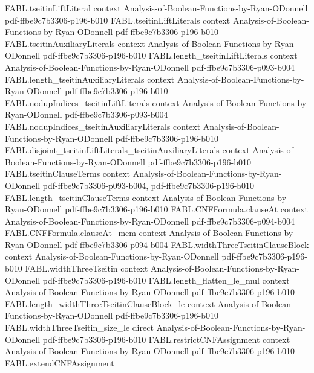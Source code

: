 \begin{theorem}
\proofstep
  {FABL.tseitinLiftLiteral}
  {context}
  {Analysis-of-Boolean-Functions-by-Ryan-ODonnell}
  {pdf-ffbe9c7b3306-p196-b010}
\proofstep
  {FABL.tseitinLiftLiterals}
  {context}
  {Analysis-of-Boolean-Functions-by-Ryan-ODonnell}
  {pdf-ffbe9c7b3306-p196-b010}
\proofstep
  {FABL.tseitinAuxiliaryLiterals}
  {context}
  {Analysis-of-Boolean-Functions-by-Ryan-ODonnell}
  {pdf-ffbe9c7b3306-p196-b010}
\proofstep
  {FABL.length_tseitinLiftLiterals}
  {context}
  {Analysis-of-Boolean-Functions-by-Ryan-ODonnell}
  {pdf-ffbe9c7b3306-p093-b004}
\proofstep
  {FABL.length_tseitinAuxiliaryLiterals}
  {context}
  {Analysis-of-Boolean-Functions-by-Ryan-ODonnell}
  {pdf-ffbe9c7b3306-p196-b010}
\proofstep
  {FABL.nodupIndices_tseitinLiftLiterals}
  {context}
  {Analysis-of-Boolean-Functions-by-Ryan-ODonnell}
  {pdf-ffbe9c7b3306-p093-b004}
\proofstep
  {FABL.nodupIndices_tseitinAuxiliaryLiterals}
  {context}
  {Analysis-of-Boolean-Functions-by-Ryan-ODonnell}
  {pdf-ffbe9c7b3306-p196-b010}
\proofstep
  {FABL.disjoint_tseitinLiftLiterals_tseitinAuxiliaryLiterals}
  {context}
  {Analysis-of-Boolean-Functions-by-Ryan-ODonnell}
  {pdf-ffbe9c7b3306-p196-b010}
\proofstep
  {FABL.tseitinClauseTerms}
  {context}
  {Analysis-of-Boolean-Functions-by-Ryan-ODonnell}
  {pdf-ffbe9c7b3306-p093-b004,
    pdf-ffbe9c7b3306-p196-b010}
\proofstep
  {FABL.length_tseitinClauseTerms}
  {context}
  {Analysis-of-Boolean-Functions-by-Ryan-ODonnell}
  {pdf-ffbe9c7b3306-p196-b010}
\proofstep
  {FABL.CNFFormula.clauseAt}
  {context}
  {Analysis-of-Boolean-Functions-by-Ryan-ODonnell}
  {pdf-ffbe9c7b3306-p094-b004}
\proofstep
  {FABL.CNFFormula.clauseAt_mem}
  {context}
  {Analysis-of-Boolean-Functions-by-Ryan-ODonnell}
  {pdf-ffbe9c7b3306-p094-b004}
\proofstep
  {FABL.widthThreeTseitinClauseBlock}
  {context}
  {Analysis-of-Boolean-Functions-by-Ryan-ODonnell}
  {pdf-ffbe9c7b3306-p196-b010}
\proofstep
  {FABL.widthThreeTseitin}
  {context}
  {Analysis-of-Boolean-Functions-by-Ryan-ODonnell}
  {pdf-ffbe9c7b3306-p196-b010}
\proofstep
  {FABL.length_flatten_le_mul}
  {context}
  {Analysis-of-Boolean-Functions-by-Ryan-ODonnell}
  {pdf-ffbe9c7b3306-p196-b010}
\proofstep
  {FABL.length_widthThreeTseitinClauseBlock_le}
  {context}
  {Analysis-of-Boolean-Functions-by-Ryan-ODonnell}
  {pdf-ffbe9c7b3306-p196-b010}
\proofstep
  {FABL.widthThreeTseitin_size_le}
  {direct}
  {Analysis-of-Boolean-Functions-by-Ryan-ODonnell}
  {pdf-ffbe9c7b3306-p196-b010}
\proofstep
  {FABL.restrictCNFAssignment}
  {context}
  {Analysis-of-Boolean-Functions-by-Ryan-ODonnell}
  {pdf-ffbe9c7b3306-p196-b010}
\proofstep
  {FABL.extendCNFAssignment}

\end{theorem}
